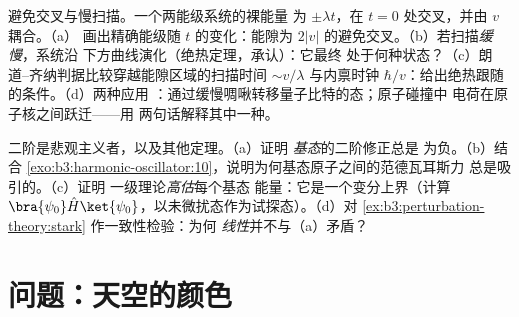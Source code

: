 \begin{exercise}[$\star\star\star$]\label{exo:b3:perturbation-theory:11}
避免交叉与慢扫描。一个两能级系统的裸能量
为 $\pm\lambda t$，在 $t = 0$ 处交叉，并由 $v$ 耦合。（a）
画出精确能级随 $t$ 的变化：能隙为
$2|v|$ 的避免交叉。（b）若扫描\emph{缓慢}，系统沿
下方曲线演化（绝热定理，承认）：它最终
处于何种状态？（c）朗道–齐纳判据比较穿越能隙区域的扫描时间
$\sim v/\lambda$ 与内禀时钟
$\hbar/v$：给出绝热跟随的条件。（d）两种应用
：通过缓慢啁啾转移量子比特的态；原子碰撞中
电荷在原子核之间跃迁——用
两句话解释其中一种。
\end{exercise}

\begin{exercise}[$\star\star\star$]\label{exo:b3:perturbation-theory:12}
二阶是悲观主义者，以及其他定理。（a）证明
\emph{基态}的二阶修正总是
为负。（b）结合
\cref{exo:b3:harmonic-oscillator:10}，说明为何基态原子之间的范德瓦耳斯力
总是吸引的。（c）证明
一级理论\emph{高估}每个基态
能量：它是一个变分上界（计算 $\bra{\psi_0}\hat
H\ket{\psi_0}$，以未微扰态作为试探态）。（d）对
\cref{ex:b3:perturbation-theory:stark} 作一致性检验：为何
\emph{线性}并不与（a）矛盾？
\end{exercise}

\section{问题：天空的颜色}

